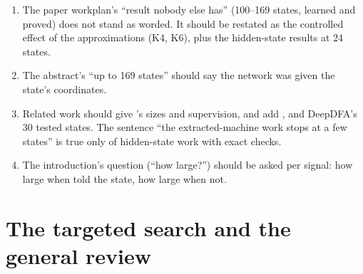 \documentclass[11pt]{article}
\begin{document}
\begin{enumerate}
\item The paper workplan's ``result nobody else has'' (100--169 states, learned and proved) does not
  stand as worded. It should be restated as the controlled effect of the approximations (K4, K6), plus
  the hidden-state results at 24 states.
\item The abstract's ``up to 169 states'' should say the network was given the state's coordinates.
\item Related work should give \citeauthor{brandoit-2026-length-independent-state-tracking}'s sizes
  and supervision, and add \citet{giles-1995-learning-class-large-finite-state-machines},
  \citet{aichernig-2024-learning-minimal-automata-rnn} and DeepDFA's 30 tested states. The sentence
  ``the extracted-machine work stops at a few states'' is true only of hidden-state work with exact
  checks.
\item The introduction's question (``how large?'') should be asked per signal: how large when told
  the state, how large when not.
\end{enumerate}

\section{The targeted search and the general review}
\label{sec:review}
\end{document}
